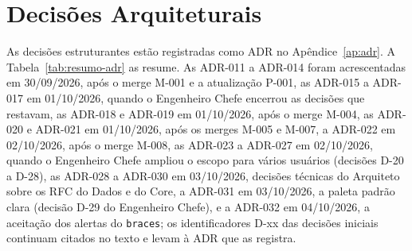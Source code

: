 \section{Decisões Arquiteturais}\label{sec:arq-decisoes}

As decisões estruturantes estão registradas como ADR no Apêndice~\ref{ap:adr}. A Tabela~\ref{tab:resumo-adr} as resume. As ADR-011 a ADR-014 foram acrescentadas em 30/09/2026, após o merge M-001 e a atualização P-001, as ADR-015 a ADR-017 em 01/10/2026, quando o Engenheiro Chefe encerrou as decisões que restavam, as ADR-018 e ADR-019 em 01/10/2026, após o merge M-004, as ADR-020 e ADR-021 em 01/10/2026, após os merges M-005 e M-007, a ADR-022 em 02/10/2026, após o merge M-008, as ADR-023 a ADR-027 em 02/10/2026, quando o Engenheiro Chefe ampliou o escopo para vários usuários (decisões D-20 a D-28), as ADR-028 a ADR-030 em 03/10/2026, decisões técnicas do Arquiteto sobre os RFC do Dados e do Core, a ADR-031 em 03/10/2026, a paleta padrão clara (decisão D-29 do Engenheiro Chefe), e a ADR-032 em 04/10/2026, a aceitação dos alertas do \texttt{braces}; os identificadores D-xx das decisões iniciais continuam citados no texto e levam à ADR que as registra.

